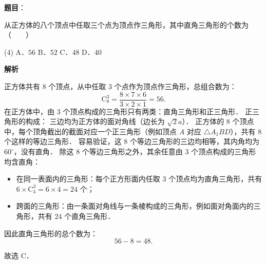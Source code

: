 \begin{answer}

\textbf{题目}：

从正方体的八个顶点中任取三个点为顶点作三角形，其中直角三角形的个数为\mbox{（　　）}

\begin{gkopts}(4)
\task A．$56$
\task B．$52$
\task C．$48$
\task D．$40$
\end{gkopts}

\textbf{解析}

正方体共有 $8$ 个顶点，从中任取 $3$ 个点作为顶点作三角形，总组合数为：
\nopagebreak[4]
\[
\mathrm{C}_8^3 = \frac{8 \times 7 \times 6}{3 \times 2 \times 1} = 56.
\]
在正方体中，由 $3$ 个顶点构成的三角形只有两类：直角三角形和正三角形．
正三角形的构成：
三边均为正方体的面对角线（边长为 $\sqrt{2}a$）．
正方体的 $8$ 个顶点中，每个顶角截出的截面对应一个正三角形（例如顶点 $A$ 对应 $\triangle A_1BD$），共有 $8$ 个这样的等边三角形．
容易验证，这 $8$ 个等边三角形的三边均相等，其内角均为 $60^\circ$，没有直角．
除这 $8$ 个等边三角形之外，其余任意由 $3$ 个顶点构成的三角形均含直角：
\begin{itemize}
\item 在同一表面内的三角形：每个正方形面内任取 $3$ 个顶点均为直角三角形，共有 $6 \times \mathrm{C}_4^3 = 6 \times 4 = 24$ 个；
\item 跨面的三角形：由一条面对角线与一条棱构成的三角形，例如面对角面内的三角形，共有 $24$ 个直角三角形．
\end{itemize}
因此直角三角形的总个数为：
\nopagebreak[4]
\[
56 - 8 = 48.
\]

故选 C．


\end{answer}
